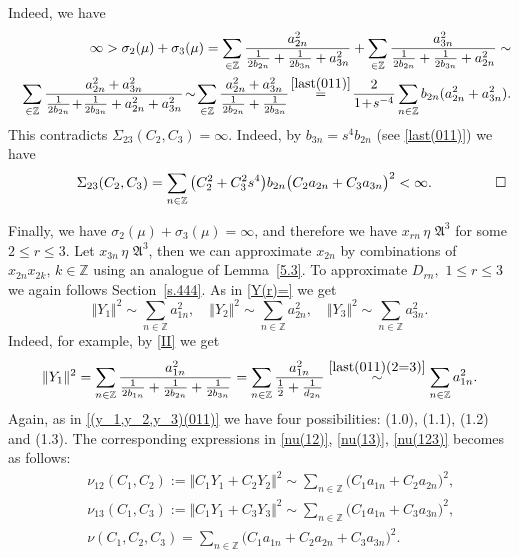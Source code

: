 \documentclass[preprint,12pt]{elsarticle}
\newcommand{\commA}[1]{\marginpar{%
\begin{color}{red}
\vskip-\baselineskip %
\raggedright\footnotesize
\itshape\hrule \smallskip A: #1\par\smallskip\hrule\end{color}}}
\numberwithin{equation}{section}
\begin{document}
\begin{pf}
Indeed, we have
\begin{eqnarray*}
&&
\infty>\sigma_{2}(\mu)+\sigma_{3}(\mu)=
\sum_{\in\mathbb
Z}\frac{a_{2n}^2}{\frac{1}{2b_{2n}}+\frac{1}{2b_{3n}}+a_{3n}^2}+
\sum_{\in\mathbb
Z}\frac{a_{3n}^2}{\frac{1}{2b_{2n}}+\frac{1}{2b_{3n}}+a_{2n}^2}\sim\\
&&
\sum_{\in\mathbb
Z}\frac{a_{2n}^2+a_{3n}^2}{\frac{1}{2b_{2n}}\!+\!\frac{1}{2b_{3n}}+a_{2n}^2+a_{3n}^2}\!\sim\!
\sum_{\in\mathbb
Z}\frac{a_{2n}^2+a_{3n}^2}{\frac{1}{2b_{2n}}+\frac{1}{2b_{3n}}}\!
\stackrel{\eqref{last(011)}}{=}\!
\frac{2}{1\!+\!s^{-4}}\sum_{n\in\mathbb
Z}b_{2n}(a_{2n}^2+a_{3n}^2).
\end{eqnarray*}
%
This contradicts $\Sigma_{23}(C_2,C_3)\!=\!\infty$. Indeed,  by $b_{3n}\!=\!s^4b_{2n}$ (see \eqref{last(011)}) we have
$$
\hskip 1.6cm
\Sigma_{23}(C_2,C_3)=
\sum_{n\in {\mathbb Z}}\big(C^2_2+C^2_3s^4\big)b_{2n}\big(C_2a_{2n}+C_3a_{3n}\big)^2<\infty.
\hskip 1.6cm \Box
$$
\end{pf}
%
%
Finally, we have $\sigma_{2}(\mu)+\sigma_{3}(\mu)=\infty$, and therefore we have
$x_{rn}\,\eta\,\, {\mathfrak A}^3$ for some $2\leq r\leq 3$.
Let $x_{3n}\,\eta\,\, {\mathfrak A}^3$, then we can approximate $x_{2n}$ by combinations of $x_{2n}x_{2k},\,k\in \mathbb Z$ using an  analogue of Lemma~\ref{5.3}.
%
%
To approximate $D_{rn},\,\,1\leq r\leq 3$ we again follows Section~\ref{s.444}.
As in \eqref{Y(r)=} we get  
\begin{equation*}
\Vert Y_1 \Vert^2\sim
\sum_{n\in \mathbb Z}a_{1n}^2,\quad
\Vert Y_2 \Vert^2\sim
\sum_{n\in \mathbb Z}a_{2n}^2,\quad
\Vert Y_3\Vert^2\sim
\sum_{n\in \mathbb Z}a_{3n}^2. 
\end{equation*}
Indeed, for example, by \eqref{II}   we get
\begin{equation*}
\Vert Y_1 \Vert^2=
\sum_{n\in \mathbb Z}\frac{a_{1n}^2}
{\frac{1}{2b_{1n}}+\frac{1}{2b_{2n}}+\frac{1}{2b_{3n}}} =
\sum_{n\in \mathbb Z}\frac{a_{1n}^2}
{\frac{1}{2}+\frac{1}{d_{2n}}}\stackrel{\eqref{last(011)(2=3)}}{\sim}
\sum_{n\in \mathbb Z}a_{1n}^2.
\end{equation*}
Again, as in  \eqref{(y_1,y_2,y_3)(011)} we have four possibilities: (1.0), (1.1), (1.2) and (1.3). The corresponding expressions in \eqref{nu(12)}, \eqref{nu(13)}, \eqref{nu(123)} becomes as follows:
\begin{eqnarray*}
&& 
\nu_{12}( C_1, C_2):=\Vert C_1Y_1+C_2Y_2\Vert^2\sim \sum_{n\in \mathbb Z}\Big( C_1a_{1n}+C_2a_{2n}\Big)^2,\\
&& 
\nu_{13}( C_1, C_3):=\Vert C_1Y_1+C_3Y_3\Vert^2\sim \sum_{n\in \mathbb Z}\Big( C_1a_{1n}+C_3a_{3n}\Big)^2,\\
\nonumber
&& 
\nu( C_1, C_2, C_3)\!=
\sum_{n\in \mathbb Z}\Big( C_1a_{1n}\!+\!C_2a_{2n}
\!+\!C_3a_{3n}\Big)^2.
\end{eqnarray*}
\end{document}

